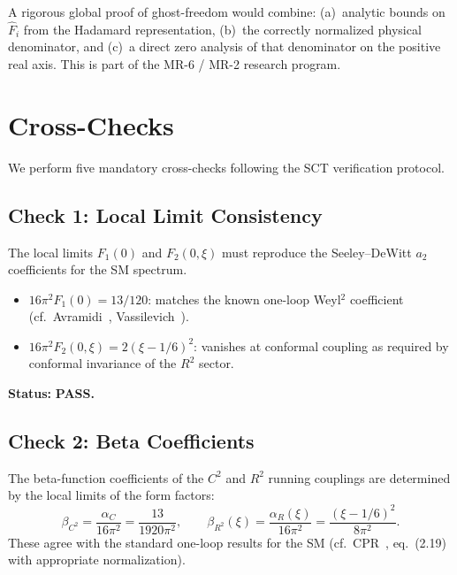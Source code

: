 \documentclass[11pt,a4paper]{article}
\theoremstyle{plain}
\theoremstyle{definition}
\begin{document}
A rigorous global proof of ghost-freedom would combine:
(a)~analytic bounds on $\hat{F}_i$ from the Hadamard representation,
(b)~the correctly normalized physical denominator, and
(c)~a direct zero analysis of that denominator on the positive real axis.
This is part of the MR-6 / MR-2 research program.

\section{Cross-Checks}\label{sec:checks}

We perform five mandatory cross-checks following the SCT verification
protocol.

\subsection{Check 1: Local Limit Consistency}

The local limits $F_1(0)$ and $F_2(0,\xi)$ must reproduce the
Seeley--DeWitt $a_2$ coefficients for the SM spectrum.

\begin{itemize}[nosep]
  \item $16\pi^2 F_1(0) = 13/120$: matches the known one-loop Weyl$^2$
    coefficient (cf.\ Avramidi~\cite{Avr00}, Vassilevich~\cite{Vas03}).
  \item $16\pi^2 F_2(0,\xi) = 2(\xi-1/6)^2$: vanishes at conformal
    coupling as required by conformal invariance of the $R^2$ sector.
\end{itemize}

\noindent\textbf{Status:} \textcolor{green!50!black}{\textbf{PASS.}}

\subsection{Check 2: Beta Coefficients}

The beta-function coefficients of the $C^2$ and $R^2$ running couplings
are determined by the local limits of the form factors:
\begin{equation}
  \beta_{C^2} = \frac{\alpha_C}{16\pi^2} = \frac{13}{1920\pi^2},
  \qquad
  \beta_{R^2}(\xi) = \frac{\alpha_R(\xi)}{16\pi^2}
  = \frac{(\xi-1/6)^2}{8\pi^2}.
\end{equation}
These agree with the standard one-loop results for the SM
(cf.\ CPR~\cite{CPR09}, eq.~(2.19) with appropriate normalization).
\end{document}
